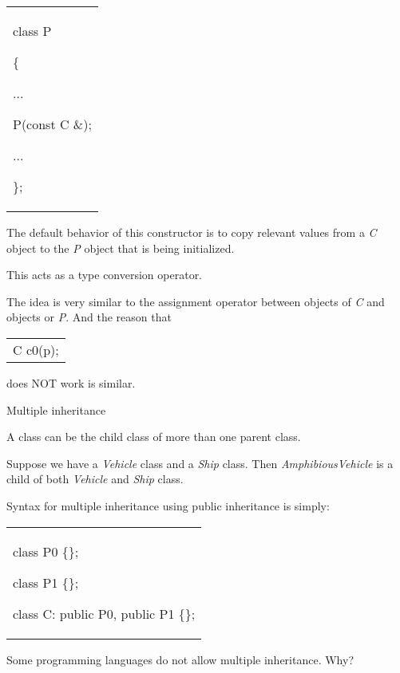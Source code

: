 \documentclass[
]{article}
\begin{document}
\begin{longtable}[]{@{}
  >{\raggedright\arraybackslash}p{}@{}}
\toprule\noalign{}
 \\
\midrule\noalign{}
\endhead
\bottomrule\noalign{}
\endlastfoot
class P

\{

...

P(const C \&);

...

\}; \\
\end{longtable}

The default behavior of this constructor is to copy relevant values from
a \emph{C} object to the \emph{P} object that is being initialized.

This acts as a type conversion operator.

The idea is very similar to the assignment operator between objects of
\emph{C} and objects or \emph{P}. And the reason that

\begin{longtable}[]{@{}l@{}}
\toprule\noalign{}
 \\
\midrule\noalign{}
\endhead
\bottomrule\noalign{}
\endlastfoot
C c0(p); \\
\end{longtable}

does NOT work is similar.

Multiple inheritance

A class can be the child class of more than one parent class.

Suppose we have a \emph{Vehicle} class and a \emph{Ship} class. Then
\emph{AmphibiousVehicle} is a child of both \emph{Vehicle} and
\emph{Ship} class.

Syntax for multiple inheritance using public inheritance is simply:

\begin{longtable}[]{@{}
  >{\raggedright\arraybackslash}p{}@{}}
\toprule\noalign{}
 \\
\midrule\noalign{}
\endhead
\bottomrule\noalign{}
\endlastfoot
class P0 \{\};

class P1 \{\};

class C: public P0, public P1 \{\}; \\
\end{longtable}

Some programming languages do not allow multiple inheritance. Why?
\end{document}
